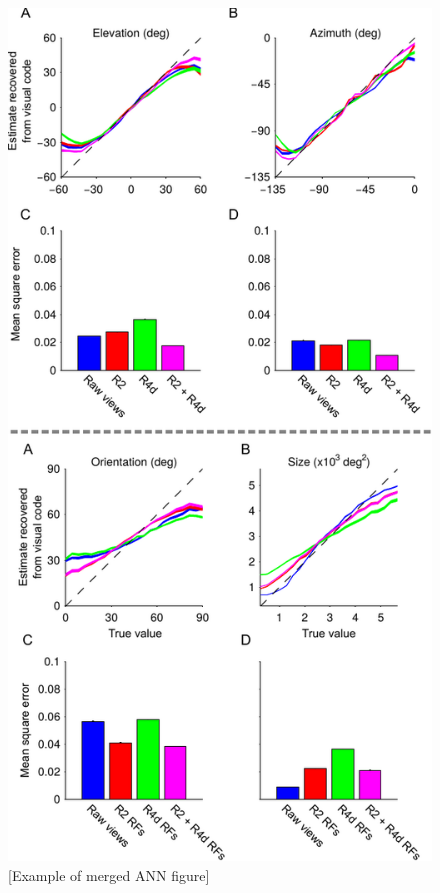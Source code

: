 


%



\begin{figure}[htp]
\centering
\includegraphics{figures/elazorsi}
\caption{[Example of merged ANN figure]}
\end{figure}


